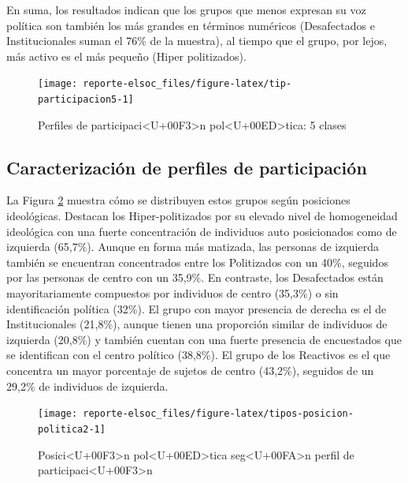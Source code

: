 \documentclass[
  12pt,
]{book}
\begin{document}
En suma, los resultados indican que los grupos que menos expresan su voz política son también los más grandes en términos numéricos (Desafectados e Institucionales suman el 76\% de la muestra), al tiempo que el grupo, por lejos, más activo es el más pequeño (Hiper politizados).

\begin{figure}

{\centering \texttt{[image: reporte-elsoc\_files/figure-latex/tip-participacion5-1]} 

}

\caption{Perfiles de participaci<U+00F3>n pol<U+00ED>tica: 5 clases}\label{fig:tip-participacion5}
\end{figure}

\hypertarget{caracterizaciuxf3n-de-perfiles-de-participaciuxf3n}{%
\subsection*{Caracterización de perfiles de participación}\label{caracterizaciuxf3n-de-perfiles-de-participaciuxf3n}}

La Figura \ref{fig:tipos-posicion-politica2} muestra cómo se distribuyen estos grupos según posiciones ideológicas. Destacan los Hiper-politizados por su elevado nivel de homogeneidad ideológica con una fuerte concentración de individuos auto posicionados como de izquierda (65,7\%). Aunque en forma más matizada, las personas de izquierda también se encuentran concentrados entre los Politizados con un 40\%, seguidos por las personas de centro con un 35,9\%. En contraste, los Desafectados están mayoritariamente compuestos por individuos de centro (35,3\%) o sin identificación política (32\%). El grupo con mayor presencia de derecha es el de Institucionales (21,8\%), aunque tienen una proporción similar de individuos de izquierda (20,8\%) y también cuentan con una fuerte presencia de encuestados que se identifican con el centro político (38,8\%). El grupo de los Reactivos es el que concentra un mayor porcentaje de sujetos de centro (43,2\%), seguidos de un 29,2\% de individuos de izquierda.

\begin{figure}

{\centering \texttt{[image: reporte-elsoc\_files/figure-latex/tipos-posicion-politica2-1]} 

}

\caption{Posici<U+00F3>n pol<U+00ED>tica seg<U+00FA>n perfil de participaci<U+00F3>n}\label{fig:tipos-posicion-politica2}
\end{figure}
\end{document}
